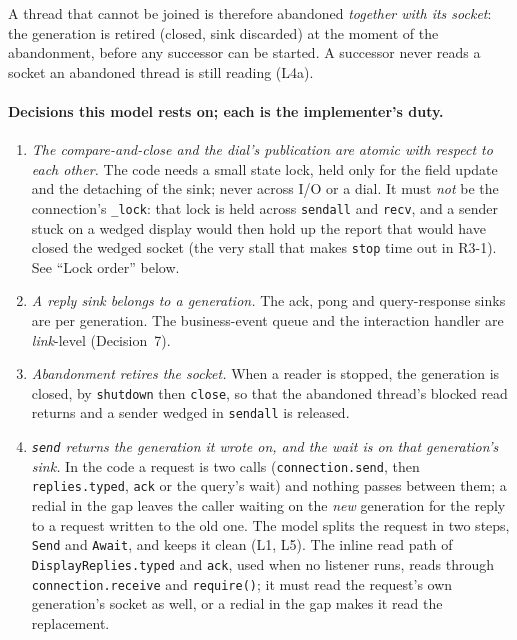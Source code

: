 \documentclass[a4paper,10pt,fleqn]{article}
\begin{document}
A thread that cannot be joined is therefore abandoned \emph{together with its
socket}: the generation is retired (closed, sink discarded) at the moment of
the abandonment, before any successor can be started.  A successor never reads
a socket an abandoned thread is still reading (L4a).

\paragraph{Decisions this model rests on; each is the implementer's duty.}
\begin{enumerate}
  \item \emph{The compare-and-close and the dial's publication are atomic with
    respect to each other.}  The code needs a small state lock, held only for
    the field update and the detaching of the sink; never across I/O or a
    dial.  It must \emph{not} be the connection's \texttt{\_lock}: that lock
    is held across \texttt{sendall} and \texttt{recv}, and a sender stuck on a
    wedged display would then hold up the report that would have closed the
    wedged socket (the very stall that makes \texttt{stop} time out in R3-1).
    See ``Lock order'' below.
  \item \emph{A reply sink belongs to a generation.}  The ack, pong and
    query-response sinks are per generation.  The business-event queue and
    the interaction handler are \emph{link}-level (Decision~7).
  \item \emph{Abandonment retires the socket.}  When a reader is stopped, the
    generation is closed, by \texttt{shutdown} then \texttt{close}, so that
    the abandoned thread's blocked read returns and a sender wedged in
    \texttt{sendall} is released.
  \item \emph{\texttt{send} returns the generation it wrote on, and the wait is
    on that generation's sink.}  In the code a request is two calls
    (\texttt{connection.send}, then \texttt{replies.typed}, \texttt{ack} or
    the query's wait) and nothing passes between them; a redial in the gap
    leaves the caller waiting on the \emph{new} generation for the reply to a
    request written to the old one.  The model splits the request in two
    steps, \texttt{Send} and \texttt{Await}, and keeps it clean (L1, L5).  The
    inline read path of \texttt{DisplayReplies.typed} and \texttt{ack}, used
    when no listener runs, reads through \texttt{connection.receive} and
    \texttt{require()}; it must read the request's own generation's socket as
    well, or a redial in the gap makes it read the replacement.

\end{enumerate}
\end{document}
